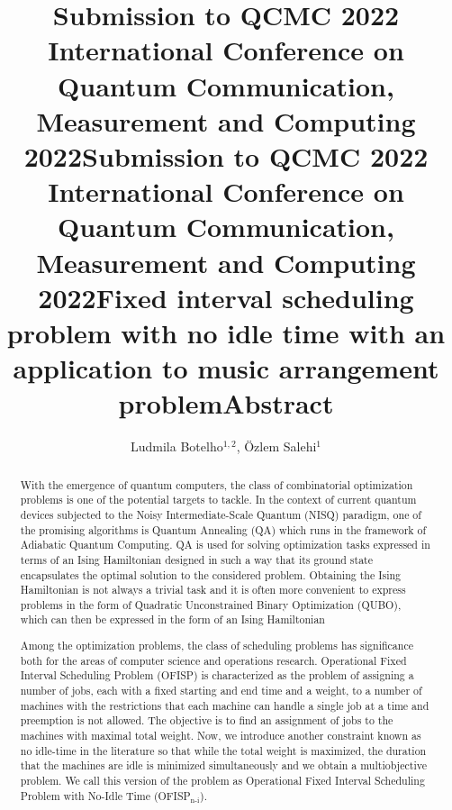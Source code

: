 \documentclass[aps,reprint]{revtex4-2}
\title@column %
\title{\normalsize Submission to QCMC 2022 \\ %
            International Conference on Quantum Communication,\\ 
            Measurement and Computing 2022}
\makeatletter
\newcommand{\printentry}{%
    \@author@finish%
    \title@column %
    \titleblock@produce %
    \suppressfloats[t] %
    \let\@AAC@list\@empty %
    \let\@AFF@list\@empty %
    \let\@AFG@list\@empty %
    \let\@address\@empty %
    \titlepage@sw %
    {\vfil\clearpage}%
}
\newcommand{\printheader}{%
    \title{\normalsize Submission to QCMC 2022 \\ %
            International Conference on Quantum Communication,\\ 
            Measurement and Computing 2022}
    \printentry
}
\makeatother
\begin{document}
\printheader



\title{Fixed interval scheduling problem with no idle time with an application to music arrangement problem} %
\author{Ludmila Botelho$^{1,2}$, \"Ozlem Salehi$^{1}$} %
{} %

\printentry
\title{\small Abstract}
\begin{abstract}
  
With the emergence of quantum computers, the class of combinatorial optimization problems is one of the potential targets to tackle. In the context of current quantum devices subjected to the Noisy Intermediate-Scale Quantum (NISQ) paradigm, one of the promising algorithms is Quantum Annealing (QA) which runs in the framework of Adiabatic Quantum Computing. QA is used for solving optimization tasks expressed in terms of an Ising Hamiltonian designed in such a way that its ground state encapsulates the optimal solution to the considered problem. Obtaining the Ising Hamiltonian is not always a trivial task and it is often more convenient to express problems in the form of  Quadratic Unconstrained Binary Optimization (QUBO), which can then be expressed in the form of an Ising Hamiltonian

Among the optimization problems, the class of scheduling problems has significance both for the areas of computer science and operations research. Operational Fixed Interval Scheduling Problem (OFISP)  is characterized as the problem of assigning a number of jobs, each with a fixed starting and end time and a weight, to a number of machines with the restrictions that each machine can handle a single job at a time and preemption is not allowed. The objective is to find an assignment of jobs to the machines with maximal total weight. Now, we introduce another constraint known as no idle-time in the literature so that while the total weight is maximized, the duration that the machines are idle is minimized simultaneously and we obtain a multiobjective problem. We call this version of the problem as Operational Fixed Interval Scheduling Problem with No-Idle Time (OFISP$_\text{n-i}$).   


\end{abstract}
\end{document}
